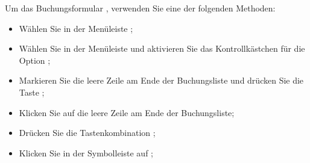 Um das Buchungsformular , verwenden Sie eine der folgenden Methoden:
\begin{itemize}
	\item Wählen Sie in der Menüleiste ;
	\item Wählen Sie in der Menüleiste  und aktivieren Sie das Kontrollkästchen für die Option ;
	\item Markieren Sie die leere Zeile am Ende der Buchungsliste und drücken Sie die Taste ;
	\item Klicken Sie auf die leere Zeile am Ende der Buchungsliste;
	\item Drücken Sie die Tastenkombination ;
	\item Klicken Sie in der Symbolleiste auf ;

\end{itemize}
